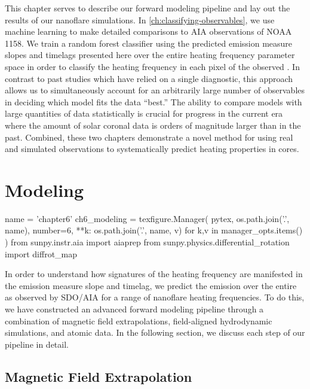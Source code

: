 This chapter serves to describe our forward modeling pipeline and lay out the results of our nanoflare simulations. In \autoref{ch:classifying-observables}, we use machine learning to make detailed comparisons to AIA observations of \AR{} NOAA 1158. We train a random forest classifier using the predicted emission measure slopes and timelags presented here over the entire heating frequency parameter space in order to classify the heating frequency in each pixel of the observed \AR{}. In contrast to past studies which have relied on a single diagnostic, this approach allows us to simultaneously account for an arbitrarily large number of observables in deciding which model fits the data ``best.'' The ability to compare models with large quantities of data statistically is crucial for progress in the current era where the amount of solar coronal data is orders of magnitude larger than in the past.  Combined, these two chapters demonstrate a novel method for using real and simulated observations to systematically predict heating properties in \AR{} cores.

\section{Modeling}\label{sec:modeling-observables:modeling}

\begin{pycode}
name = 'chapter6'
ch6_modeling = texfigure.Manager(
    pytex,
    os.path.join('.', name),
    number=6,
    **{k: os.path.join('.', name, v) for k,v in manager_opts.items()}
)
from sunpy.instr.aia import aiaprep
from sunpy.physics.differential_rotation import diffrot_map
\end{pycode}

In order to understand how signatures of the heating frequency are manifested in the emission measure slope and timelag, we predict the emission over the entire \AR{} as observed by SDO/AIA for a range of nanoflare heating frequencies. To do this, we have constructed an advanced forward modeling pipeline through a combination of magnetic field extrapolations, field-aligned hydrodynamic simulations, and atomic data. In the following section, we discuss each step of our pipeline in detail.

\subsection{Magnetic Field Extrapolation}\label{sec:modeling-observables:field}

